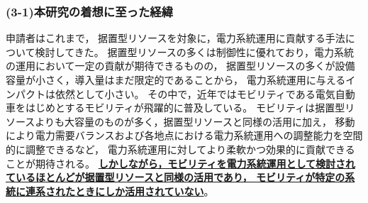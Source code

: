 \documentclass[11pt,a4paper,uplatex,dvipdfmx]{ujarticle} 		%
\newcommand{\研究課題名}{モビリティの時空間調整を活用した電力設備形成構築}
\newcommand{\研究機関名}{名古屋工業大学}
\newcommand{\研究代表者氏名}{中村勇太}
\newcommand{\研究期間の最終元号年度}{10}  %
\begin{document}



\vspace{-1\baselineskip}           %
\subsubsection*{(3-1)本研究の着想に至った経緯}
\vspace{-0.5\baselineskip}           %

申請者はこれまで，%
据置型リソースを対象に，電力系統運用に貢献する手法について検討してきた。
据置型リソースの多くは制御性に優れており，電力系統の運用において一定の貢献が期待できるものの，
据置型リソースの多くが設備容量が小さく，導入量はまだ限定的であることから，
電力系統運用に与えるインパクトは依然として小さい。
その中で，近年ではモビリティである電気自動車をはじめとするモビリティが飛躍的に普及している。
モビリティは据置型リソースよりも大容量のものが多く，据置型リソースと同様の活用に加え，
移動により電力需要バランスおよび各地点における電力系統運用への調整能力を空間的に調整できるなど，
電力系統運用に対してより柔軟かつ効果的に貢献できることが期待される。
\textbf{\ul{しかしながら，モビリティを電力系統運用として検討されているほとんどが据置型リソースと同様の活用であり，
モビリティが特定の系統に連系されたときにしか活用されていない}}。
\end{document}
